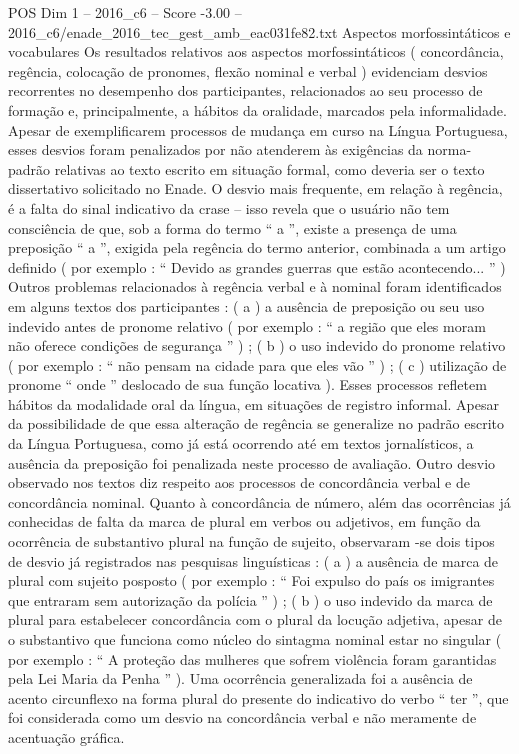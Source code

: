\begin{textsample}{POS Dim 1 – 2016\_c6 – Score -3.00 – 2016\_c6/enade\_2016\_tec\_gest\_amb\_eac031fe82.txt}
Aspectos morfossintáticos e vocabulares Os resultados relativos aos aspectos morfossintáticos ( concordância, regência, colocação de pronomes, flexão nominal e verbal ) evidenciam desvios recorrentes no desempenho dos participantes, relacionados ao seu processo de formação e, principalmente, a hábitos da oralidade, marcados pela informalidade.
Apesar de exemplificarem processos de mudança em curso na Língua Portuguesa, esses desvios foram penalizados por não atenderem às exigências da norma-padrão relativas ao texto escrito em situação formal, como deveria ser o texto dissertativo solicitado no Enade.
O desvio mais frequente, em relação à regência, é a falta do sinal indicativo da crase – isso revela que o usuário não tem consciência de que, sob a forma do termo “ a ”, existe a presença de uma preposição “ a ”, exigida pela regência do termo anterior, combinada a um artigo definido ( por exemplo : “ Devido as grandes guerras que estão acontecendo... ” ) Outros problemas relacionados à regência verbal e à nominal foram identificados em alguns textos dos participantes : ( a ) a ausência de preposição ou seu uso indevido antes de pronome relativo ( por exemplo : “ a região que eles moram não oferece condições de segurança ” ) ; ( b ) o uso indevido do pronome relativo ( por exemplo : “ não pensam na cidade para que eles vão ” ) ; ( c ) utilização de pronome “ onde ” deslocado de sua função locativa ).
Esses processos refletem hábitos da modalidade oral da língua, em situações de registro informal.
Apesar da possibilidade de que essa alteração de regência se generalize no padrão escrito da Língua Portuguesa, como já está ocorrendo até em textos jornalísticos, a ausência da preposição foi penalizada neste processo de avaliação.
Outro desvio observado nos textos diz respeito aos processos de concordância verbal e de concordância nominal.
Quanto à concordância de número, além das ocorrências já conhecidas de falta da marca de plural em verbos ou adjetivos, em função da ocorrência de substantivo plural na função de sujeito, observaram -se dois tipos de desvio já registrados nas pesquisas linguísticas : ( a ) a ausência de marca de plural com sujeito posposto ( por exemplo : “ Foi expulso do país os imigrantes que entraram sem autorização da polícia ” ) ; ( b ) o uso indevido da marca de plural para estabelecer concordância com o plural da locução adjetiva, apesar de o substantivo que funciona como núcleo do sintagma nominal estar no singular ( por exemplo : “ A proteção das mulheres que sofrem violência foram garantidas pela Lei Maria da Penha ” ).
Uma ocorrência generalizada foi a ausência de acento circunflexo na forma plural do presente do indicativo do verbo “ ter ”, que foi considerada como um desvio na concordância verbal e não meramente de acentuação gráfica.

\end{textsample}
